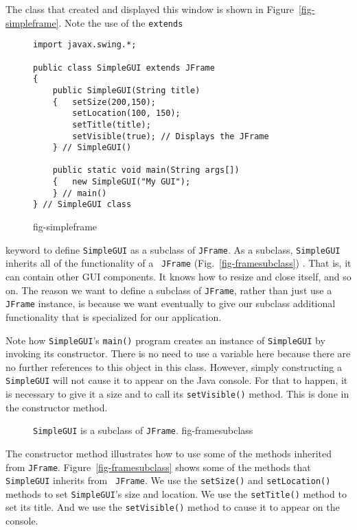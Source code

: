 The class that created and displayed this window is shown in
Figure~\ref{fig-simpleframe}.  Note the use of the {\tt extends}
\begin{figure}[h!]
\jjjprogstart
\begin{jjjlisting}
\begin{lstlisting}
import javax.swing.*;

public class SimpleGUI extends JFrame 
{
    public SimpleGUI(String title) 
    {   setSize(200,150);
        setLocation(100, 150);
        setTitle(title);
        setVisible(true); // Displays the JFrame
    } // SimpleGUI()

    public static void main(String args[]) 
    {   new SimpleGUI("My GUI");
    } // main()
} // SimpleGUI class
\end{lstlisting}
\end{jjjlisting}
{fig-simpleframe}
\end{figure}
keyword to define {\tt SimpleGUI} as a subclass of {\tt JFrame}.  As a
subclass, {\tt SimpleGUI} inherits all of the functionality of a {\tt
JFrame} (Fig.~\ref{fig-framesubclass}) . That is, it can contain
other GUI components. It knows how to resize and close itself, and so
on. The reason we want to define a subclass of {\tt JFrame}, rather
than just use a {\tt JFrame} instance, is because we want eventually
to give our subclass additional functionality that is specialized for
our application.



Note how {\tt SimpleGUI}'s {\tt main()} program  creates an
instance of {\tt SimpleGUI} by invoking its constructor. There is no
need to use a variable here because there are no further references
to this object in this class.  However, simply
constructing a {\tt SimpleGUI} will not cause it to
appear on the Java console. For that to happen, it is necessary
to give it a size and to call its {\tt setVisible()} method. This is
done in the constructor method.

\begin{figure}[h!]
{{\tt SimpleGUI} is a subclass of {\tt JFrame}.}
{fig-framesubclass}

\end{figure}

The constructor method illustrates how to use some of the methods
inherited from {\tt JFrame}.  Figure~\ref{fig-framesubclass} shows
some of the methods that {\tt SimpleGUI} inherits from {\tt
JFrame}. We use the {\tt setSize()} and {\tt setLocation()} methods to
set {\tt SimpleGUI}'s size and location. We use the {\tt setTitle()}
method to set its title. And we use the {\tt setVisible()} method to cause
it to appear on the console.

